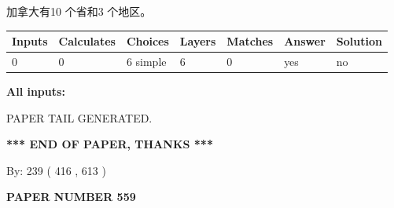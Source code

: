 \documentclass{ctexart}
\begin{document}
 
加拿大有10 个省和3 个地区。
 
 
\noindent{}
 
 
   
   
   
   
\noindent\begin{tabular}{|l|l|l|l|l|l|l|}
 \hline
Inputs & Calculates & Choices & Layers & Matches & Answer & Solution \\ \hline
 0  & 
 0  & 
 6
  simple  
  & 
 6  & 
 0  & 
  yes & 
  no 
  \\ \hline
 \end{tabular}
   
   
   
   
\noindent{}
   
   
   
   
\noindent\vspace{0.1in}\hspace{-0.08in} {\textbf{\Large{All inputs: }}}
   
   
   
   
   
   
 \vspace{0.2in}
 
   
   
\vspace{2.0in} PAPER TAIL GENERATED.
   
   
   
   
\vspace{1.0in} 
{\textbf{\large{ *** END OF PAPER, THANKS *** }}} 
   
   
\hspace{1.0in} By: 
 239 ( 416 ,  613 )
   
   
   
   
\newpage 
\setcounter{page}{ 
   559001 } 
   
   
   
   
 {\textbf{ \Large{ PAPER NUMBER  559  }}}
   
   
\vspace{0.2in}
   
   
   
   
   
   
   
\end{document}
